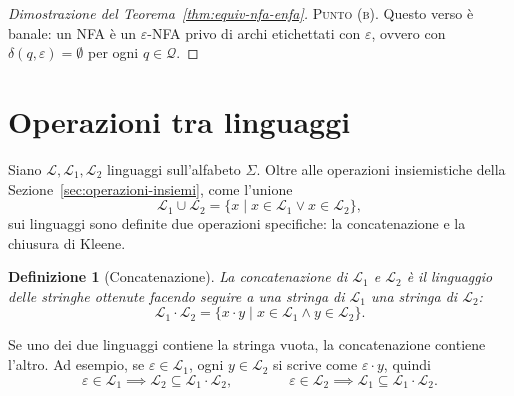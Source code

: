 \documentclass[a4paper, 11pt, oneside]{book}
\theoremstyle{formale}
\newtheorem*{definition}{Definizione}
\begin{document}
\begin{proof}[Dimostrazione del Teorema~\ref{thm:equiv-nfa-enfa}]
        \textsc{Punto (b)}. Questo verso \`e banale: un NFA \`e un $\varepsilon$-NFA privo
        di archi etichettati con $\varepsilon$, ovvero con $\delta(q, \varepsilon) =
        \emptyset$ per ogni $q \in \mathcal{Q}$.
    \end{proof}

    \section{Operazioni tra linguaggi}
    \label{sec:operazioni-linguaggi}
    Siano $\mathcal{L}, \mathcal{L}_1, \mathcal{L}_2$ linguaggi sull'alfabeto $\Sigma$.
    Oltre alle operazioni insiemistiche della Sezione~\ref{sec:operazioni-insiemi}, come
    l'unione
    \begin{equation*}
        \mathcal{L}_1 \cup \mathcal{L}_2
        = \{x \mid x \in \mathcal{L}_1 \lor x \in \mathcal{L}_2\},
    \end{equation*}
    sui linguaggi sono definite due operazioni specifiche: la concatenazione e la chiusura
    di Kleene.

    \begin{definition}[Concatenazione]
        La \emph{concatenazione} di $\mathcal{L}_1$ e $\mathcal{L}_2$ \`e il linguaggio
        delle stringhe ottenute facendo seguire a una stringa di $\mathcal{L}_1$ una
        stringa di $\mathcal{L}_2$:
        \begin{equation*}
            \mathcal{L}_1 \cdot \mathcal{L}_2
            = \{x \cdot y \mid x \in \mathcal{L}_1 \land y \in \mathcal{L}_2\}.
        \end{equation*}
    \end{definition}
    Se uno dei due linguaggi contiene la stringa vuota, la concatenazione contiene l'altro.
    Ad esempio, se $\varepsilon \in \mathcal{L}_1$, ogni $y \in \mathcal{L}_2$ si scrive
    come $\varepsilon \cdot y$, quindi
    \begin{equation*}
        \varepsilon \in \mathcal{L}_1 \implies
            \mathcal{L}_2 \subseteq \mathcal{L}_1 \cdot \mathcal{L}_2,
        \qquad\qquad
        \varepsilon \in \mathcal{L}_2 \implies
            \mathcal{L}_1 \subseteq \mathcal{L}_1 \cdot \mathcal{L}_2.
    \end{equation*}
\end{document}
